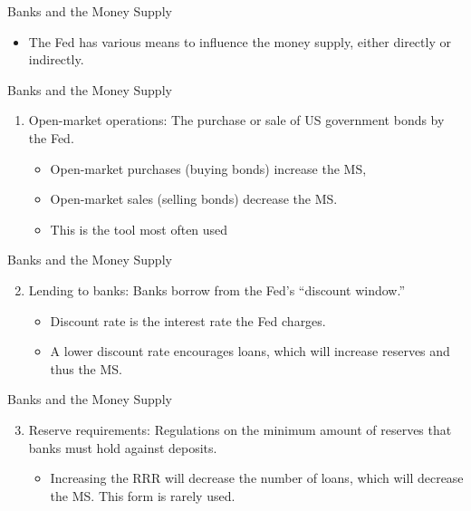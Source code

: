 \documentclass[xcolor={dvipsnames},pdf, hyperref={colorlinks=true, citecolor=ForestGreen, linkcolor=BlueViolet, urlcolor=Magenta}]{beamer}
\theoremstyle{definition}
\begin{document}
\begin{frame}{Banks and the Money Supply}
\begin{itemize}
	\item The Fed has various means to influence the money supply, either directly or indirectly.

\end{itemize}
\end{frame}

\begin{frame}{Banks and the Money Supply}

	\begin{enumerate}
		\item Open-market operations: The purchase or sale of US government bonds by the Fed. \begin{itemize}
			\item Open-market purchases (buying bonds) increase the MS, 
			\item Open-market sales (selling bonds) decrease the MS. 
			\item This is the tool most often used
		\end{itemize}
	\end{enumerate}

\end{frame}

\begin{frame}{Banks and the Money Supply}

	\begin{enumerate}
		\setcounter{enumi}{1}
		\item Lending to banks: Banks borrow from the Fed's ``discount window.'' 
		\begin{itemize}
			\item Discount rate is the interest rate the Fed charges. 
			\item A lower discount rate encourages loans, which will increase reserves and thus the MS.
		\end{itemize}

	\end{enumerate}

\end{frame}

\begin{frame}{Banks and the Money Supply}

	\begin{enumerate}
		\setcounter{enumi}{2}
		\item Reserve requirements: Regulations on the minimum amount of reserves that banks must hold against deposits. 
		\begin{itemize}
			\item Increasing the RRR will decrease the number of loans, which will decrease the MS. This form is rarely used.
		\end{itemize}
	\end{enumerate}

\end{frame}
\end{document}
